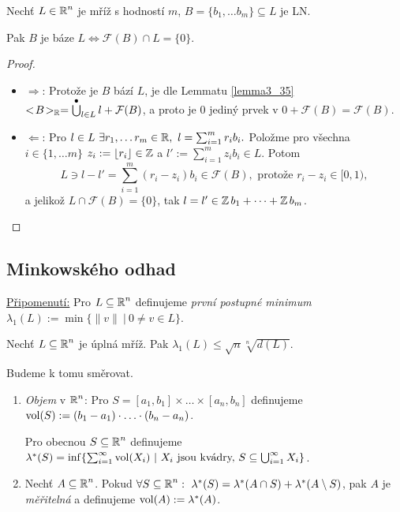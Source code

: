 \begin{claim}
Nechť $L \in \operatorname{\mathbb{R}}^n$ je mříž s hodností $m$, $B = \{b_1,\dots b_m\} \subseteq L$ je LN. 

Pak $B$ je báze $L \iff \mathcal{F}(B) \cap L = \{0\}$.
\end{claim}
\begin{proof}
\phantom{}
\begin{itemize}[label={}]
    \item $\Rightarrow$: Protože je $B$ bází $L$, je dle Lemmatu \ref{lemma3_35} $<\!B\!>_{\operatorname{\mathbb{R}}} = \operatorname*{\overset{\bullet}{\bigcup}}_{l \in L} l + \mathcal{F}(B)$, a proto je $0$ jediný prvek v $0 + \mathcal{F}(B) = \mathcal{F}(B)$.
    
    \item $\Leftarrow$: Pro $l \in L \ \exists r_1, \dots r_m \in \operatorname{\mathbb{R}}, \ l = \sum_{i=1}^m r_i b_i.$ Položme pro všechna $i \in \{1,\dots m\}$ $z_i := \lfloor r_i \rfloor \in \operatorname{\mathbb{Z}}$ a $l' := \sum_{i=1}^m z_i b_i \in L$. Potom
    \begin{equation*}
        L \ni l - l' = \sum_{i=1}^m \left(r_i - z_i \right)b_i \in \mathcal{F}(B), \text{ protože }r_i - z_i \in [0,1),
    \end{equation*}
    a jelikož $L \cap \mathcal{F}(B) = \{0\}$, tak $l = l' \in \operatorname{\mathbb{Z}} b_1 + \dots + \operatorname{\mathbb{Z}} b_m$.
\end{itemize}
\end{proof}

\subsection{Minkowského odhad}
\underline{Připomenutí:} Pro $L \subseteq \operatorname{\mathbb{R}}^n$ definujeme \emph{první postupné minimum} $\lambda_1(L) := \min\{\|v\| \ | \ 0 \neq v \in L\}$.

\begin{theorem}[Minkowski]
Nechť $L \subseteq \operatorname{\mathbb{R}}^n$ je úplná mříž. Pak $\lambda_1(L) \leq \sqrt{n}\sqrt[n]{d(L)}$.
\end{theorem}

Budeme k tomu směrovat.

\begin{definition}
\phantom{}
\begin{enumerate}
    \item \emph{Objem} v $\operatorname{\mathbb{R}}^n$: Pro $S = [a_1,b_1] \times \dots \times [a_n,b_n]$ definujeme $\operatorname{vol}(S) := (b_1 - a_1)\cdot\ldots\cdot(b_n - a_n)$.
    
    Pro obecnou $S \subseteq \operatorname{\mathbb{R}}^n$ definujeme $\lambda^*(S)=\inf\{\sum_{i=1}^\infty \operatorname{vol}(X_i) \ | \ X_i \text{ jsou kvádry, }S \subseteq \bigcup_{i=1}^\infty X_i \}$.
    
    \item Nechť $A \subseteq \operatorname{\mathbb{R}}^n$. Pokud $\forall S \subseteq \Real^n: \ \lambda^*(S) = \lambda^*(A \cap S) + \lambda^*(A \setminus S)$, pak $A$ je \emph{měřitelná} a definujeme $\operatorname{vol}(A) := \lambda^*(A)$.
\end{enumerate}
\end{definition}

